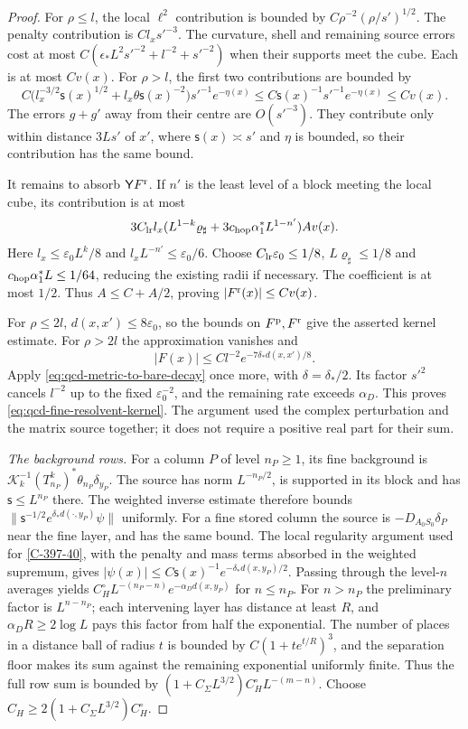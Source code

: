 \documentclass[11pt,letterpaper,reqno]{amsart}
\theoremstyle{definition}
\theoremstyle{remark}
\begin{document}
\begin{proof}
For $\rho\le l$, the local $\ell^2$ contribution is bounded by
$C\rho^{-2}(\rho/s')^{1/2}$. The penalty contribution is
$C l_xs'^{-3}$. The curvature, shell and remaining source
errors cost at most
$C(\epsilon_*L^2s'^{-2}+l^{-2}+s'^{-2})$ when their
supports meet the cube. Each is at most $Cv(x)$.
For $\rho>l$, the first two contributions are bounded by
\[
 C\bigl(l_x^{-3/2}\mathsf s(x)^{1/2}
              +l_x\theta\mathsf s(x)^{-2}\bigr)s'^{-1}e^{-\eta(x)}
 \le C\mathsf s(x)^{-1}s'^{-1}e^{-\eta(x)}\le Cv(x).
\]
The errors $g+g'$ away from their centre are $O(s'^{-3})$.
They contribute only within distance $3Ls'$ of $x'$, where
$\mathsf s(x)\asymp s'$ and $\eta$ is bounded, so their
contribution has the same bound.

It remains to absorb $\mathsf YF^{\rm r}$. If $n'$ is the
least level of a block meeting the local cube, its contribution
is at most
\[
 3C_{\rm lr}l_x
 (L^{1-k}\varrho_\sharp+3c_{\rm hop}\alpha_1^*L^{1-n'})A v(x).
\]
Here $l_x\le\varepsilon_0L^k/8$ and
$l_xL^{-n'}\le\varepsilon_0/6$. Choose
$C_{\rm lr}\varepsilon_0\le1/8$,
$L\varrho_\sharp\le1/8$ and
$c_{\rm hop}\alpha_1^*L\le1/64$, reducing the existing
radii if necessary. The coefficient is at most $1/2$.
Thus $A\le C+A/2$, proving $|F^{\rm r}(x)|\le Cv(x)$.

For $\rho\le2l$, $d(x,x')\le8\varepsilon_0$, so the bounds
on $F^{\rm p},F^{\rm r}$ give the asserted kernel estimate.
For $\rho>2l$ the approximation vanishes and
\[
 |F(x)|\le Cl^{-2}e^{-7\delta_*d(x,x')/8}.
\]
Apply \eqref{eq:qcd-metric-to-bare-decay} once more, with
$\delta=\delta_*/2$. Its factor $s'^2$ cancels $l^{-2}$
up to the fixed $\varepsilon_0^{-2}$, and the remaining
rate exceeds $\alpha_D$. This proves
\eqref{eq:qcd-fine-resolvent-kernel}. The argument used the
complex perturbation and the matrix source together; it
does not require a positive real part for their sum.

\emph{The background rows.}
For a column $P$ of level $n_P\ge1$, its fine background
is $\mathcal K_k^{-1}(T^k_{n_P})^*\theta_{n_P}\delta_{y_P}$.
The source has norm $L^{-n_P/2}$, is supported in its
block and has $\mathsf s\le L^{n_P}$ there.  The weighted
inverse estimate therefore bounds
$\|\mathsf s^{-1/2}e^{\delta_*d(\cdot,y_P)}\psi\|$
uniformly.  For a fine stored column the source is
$-D_{A_0S_0}\delta_P$ near the fine layer, and has the
same bound.  The local regularity argument used for
\cref{C-397-40}, with the penalty and mass terms
absorbed in the weighted supremum, gives
$|\psi(x)|\le C\mathsf s(x)^{-1}e^{-\delta_*d(x,y_P)/2}$.
Passing through the level-$n$ averages yields
$C_H^\circ L^{-(n_P-n)}e^{-\alpha_Dd(x,y_P)}$ for
$n\le n_P$.  For $n>n_P$ the preliminary factor is
$L^{n-n_P}$; each intervening layer has distance at
least $R$, and $\alpha_DR\ge2\log L$ pays this factor
from half the exponential.  The number of places in
a distance ball of radius $t$ is bounded by
$C(1+te^{t/R})^3$, and the separation floor makes its
sum against the remaining exponential uniformly finite.
Thus the full row sum is bounded by
$(1+C_\Sigma L^{3/2})C_H^\circ L^{-(m-n)}$.
Choose $C_H\ge2(1+C_\Sigma L^{3/2})C_H^\circ$.


\end{proof}
\end{document}
